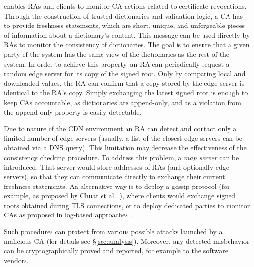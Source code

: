 \label{sec:details:consist}
\name enables RAs and clients to monitor CA actions related to certificate
revocations. Through the construction of trusted dictionaries and validation
logic, a CA has to provide freshness statements, which are short, unique, and
unforgeable pieces of information about a dictionary's content. This message can
be used directly by RAs to monitor the consistency of dictionaries. The goal is
to ensure that a given party of the system has the same view of the dictionaries
as the rest of the system.  In order to achieve this property, an RA can
periodically request a random edge server for its copy of the signed root. Only
by comparing local and downloaded values, the RA can confirm that a copy stored
by the edge server is identical to the RA's copy. Simply exchanging the latest
signed root is enough to keep CAs accountable, as dictionaries are append-only,
and as a violation from the append-only property is easily detectable.

Due to nature of the CDN environment an RA can detect and contact only a limited
number of edge servers (usually, a list of the closest edge servers can be
obtained via a DNS query). This limitation may decrease the effectiveness of the
consistency checking procedure. To address this problem, a \textit{map server}
can be introduced. That server would store addresses of RAs (and optionally edge
servers), so that they can communicate directly to exchange their current
freshness statements. An alternative way is to deploy a gossip protocol (for
example, as proposed by Chuat et al.~\cite{gossip2015}), where clients would
exchange signed roots obtained during TLS connections, or to deploy dedicated
parties to monitor CAs as proposed in log-based
approaches~\cite{KimHuaPerJacGli13}.

Such procedures can protect from various possible attacks launched by a
malicious CA (for details see \S\ref{sec:analysis}). Moreover, any detected
misbehavior can be cryptographically proved and reported, for example to the
software vendors.

